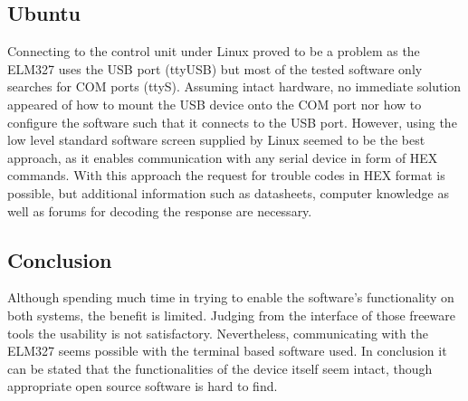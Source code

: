 \subsection{Ubuntu}
Connecting to the control unit under Linux proved to be a problem as the ELM327 uses the USB port (ttyUSB) but most of the tested software only 
searches for COM ports (ttyS).
Assuming intact hardware, no immediate solution appeared of how to mount the USB device onto the COM port nor how to configure the software such that 
it connects to the USB port. However, using the low level standard software screen supplied by Linux seemed to be the best approach, as it enables 
communication with any serial device in form of HEX commands. With this approach the request for trouble codes in HEX format is possible, but 
additional information such as datasheets, computer knowledge as well as forums for decoding the response are necessary.

\subsection{Conclusion}
Although spending much time in trying to enable the software’s functionality on both systems, the benefit is limited. Judging from the interface of 
those freeware tools the usability is not satisfactory. Nevertheless, communicating with the ELM327 seems possible with the terminal based software 
used. In conclusion it can be stated that the functionalities of the device itself seem intact, though appropriate open source software is hard to 
find.
